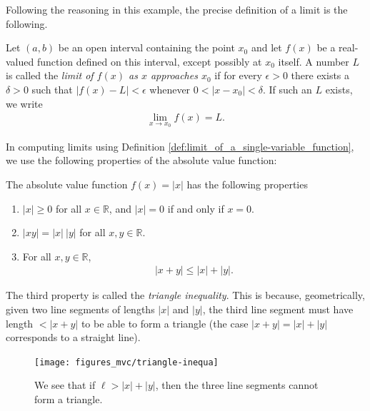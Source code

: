 \documentclass[12pt,letterpaper,reqno]{article}
\numberwithin{equation}{section}
\newcommand{\R}{\ensuremath{\mathbb R}}
\begin{document}
{Following the reasoning in this example,  the precise definition of a limit is the following.

\begin{defn}\label{def:limit_of_a_single-variable_function}
	Let $(a,b)$ be an open interval containing the point $x_0$ and let $f(x)$ be a real-valued function defined on this interval, except possibly at $x_0$ itself. A number $L$ is called the \emph{limit of $f(x)$ as $x$ approaches $x_0$} if for every $\epsilon>0$ there exists a $\delta>0$ such that $|f(x)-L|<\epsilon$ whenever $0<|x-x_0|<\delta$. If such an $L$ exists, we write
	\begin{align*}
		\lim_{x \to x_0}f(x)=L.
	\end{align*}
\end{defn}

In computing limits using Definition \ref{def:limit_of_a_single-variable_function}, we use the following properties of the absolute value function:

\begin{thm}\label{thm:triangle_inequality}
The absolute value function $f(x)=|x|$ has the following properties
\begin{enumerate}[(1)]
	\item $|x|\geq 0$ for all $x \in \R$, and $|x|=0$ if and only if $x=0$.
	\item $|xy|=|x| \ |y|$ for all $x,y \in \R$.
	\item For all $x,y \in \R$, 
	\begin{align*}
		|x+y| \leq |x|+|y|.
	\end{align*}
\end{enumerate}	
\end{thm}
The third property is called the \emph{triangle inequality}. This is because, geometrically, given two line segments of lengths $|x|$ and $|y|$, the third line segment must have length $< |x+y|$ to be able to form a triangle (the case $|x+y|=|x|+|y|$ corresponds to a straight line). 
\begin{figure}[h]
	\begin{center}
		\texttt{[image: figures\_mvc/triangle-inequa]}
	\end{center}
	\caption{We see that if $\ell>|x|+|y|$, then the three line segments cannot form a triangle.}
\end{figure}
\newpage 

}
\end{document}
